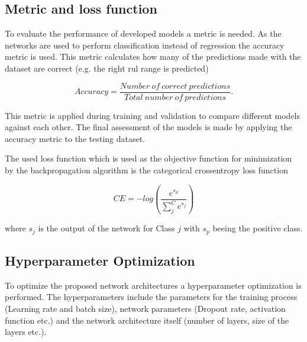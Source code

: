 \documentclass[conference]{IEEEtran}
\begin{document}


\noindent
\subsection{Metric and loss function}

To evaluate the performance of developed models a metric is needed. As the networks are used to perform classification instead of regression the accuracy metric is used. This metric calculates how many of the predictions made with the dataset are correct (e.g. the right \gls{rul} range is predicted)

\begin{equation}
	\label{eq:categorical-cross-entrophy}
	Accuracy = \frac{Number \: of \: correct \: predictions}{Total \: number \: of \: predictions}.
\end{equation}

This metric is applied during training and validation to compare different models against each other. The final assessment of the models is made by applying the accuracy metric to the testing dataset.

The used loss function which is used as the objective function for minimization by the backpropagation algorithm is the categorical crossentropy loss function

\begin{equation}
	\label{eq:categorical-cross-entrophy}
	CE = -log(\frac{e^{s_p}}{\sum_{j}^{C} e^{s_j}})	
\end{equation}

where $ s_j $ is the output of the network for Class $ j $ with $ s_p $ beeing the positive class.


\noindent
\subsection{Hyperparameter Optimization}

To optimize the proposed network architectures a hyperparameter optimization is performed. The hyperparameters include the parameters for the training process (Learning rate and batch size), network parameters (Dropout rate, activation function etc.) and the network architecture itself (number of layers, size of the layers etc.).
\end{document}

